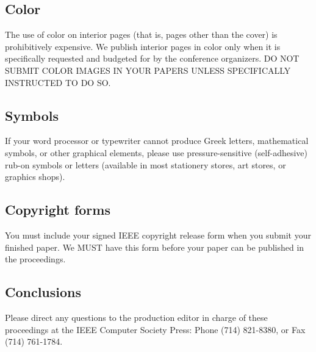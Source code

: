 \documentclass[10pt,twocolumn]{IEEEtran}
\begin{document}
\subsection{Color}

The use of color on interior pages (that is, pages other
than the cover) is prohibitively expensive. We publish interior pages in
color only when it is specifically requested and budgeted for by the
conference organizers. DO NOT SUBMIT COLOR IMAGES IN YOUR
PAPERS UNLESS SPECIFICALLY INSTRUCTED TO DO SO.

\subsection{Symbols}

If your word processor or typewriter cannot produce Greek letters,
mathematical symbols, or other graphical elements, please use
pressure-sensitive (self-adhesive) rub-on symbols or letters (available
in most stationery stores, art stores, or graphics shops).

\subsection{Copyright forms}

You must include your signed IEEE copyright release form when you submit
your finished paper. We MUST have this form before your paper can be
published in the proceedings.

\subsection{Conclusions}

Please direct any questions to the production editor in charge of these
proceedings at the IEEE Computer Society Press: Phone (714) 821-8380, or
Fax (714) 761-1784.



\end{document}

